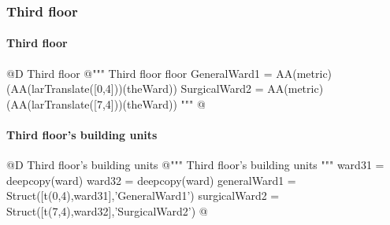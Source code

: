\documentclass[11pt,oneside]{article}    %
\begin{document}
\subsubsection{Third floor}
\paragraph{Third floor}
@D Third floor
@{""" Third floor floor 
GeneralWard1 = AA(metric)(AA(larTranslate([0,4]))(theWard))
SurgicalWard2 = AA(metric)(AA(larTranslate([7,4]))(theWard)) """
@}


\paragraph{Third floor's building units}
@D Third floor's building units 
@{""" Third floor's building units """
ward31 = deepcopy(ward)
ward32 = deepcopy(ward)
generalWard1 = Struct([t(0,4),ward31],'GeneralWard1')
surgicalWard2 = Struct([t(7,4),ward32],'SurgicalWard2')
@}
\end{document}
